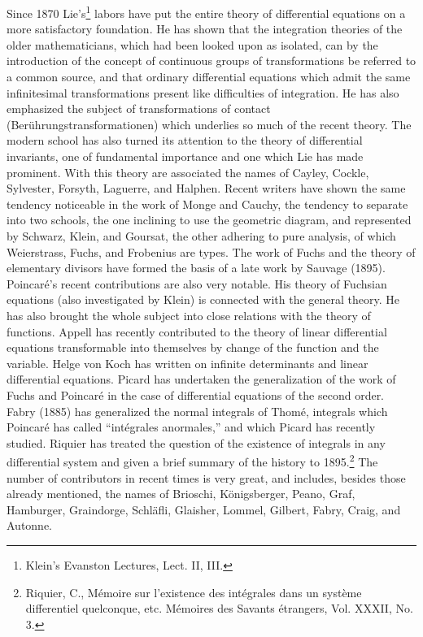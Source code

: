 \documentclass[oneside]{book}
\begin{document}
{Since 1870 Lie's\footnote{Klein's Evanston Lectures, Lect. II,
III.} labors have put the entire theory of differential equations
on a more satisfactory foundation. He has shown that the integration
theories of the older mathematicians, which had been looked upon as
isolated, can by the introduction of the concept of continuous
groups of transformations be referred to a common source, and that
ordinary differential equations which admit the same infinitesimal
transformations present like difficulties of integration. He has
also emphasized the subject of transformations of contact
(Ber\"uhrungstransformationen) which underlies so much of the recent
theory. The modern school has also turned its attention to the
theory of differential invariants, one of fundamental importance and
one which Lie has made prominent. With this theory are associated
the names of Cayley, Cockle, Sylvester, Forsyth, Laguerre, and
Halphen. Recent writers have shown the same tendency noticeable in
the work of Monge and Cauchy, the tendency to separate into two
schools, the one inclining to use the geometric diagram, and
represented by Schwarz, Klein, and Goursat, the other adhering to
pure analysis, of which Weierstrass, Fuchs, and Frobenius are
types. The work of Fuchs and the theory of elementary divisors have
formed the basis of a late work by Sauvage (1895). Poincar\'e's
recent contributions are also very notable. His theory of Fuchsian
equations (also investigated by Klein) is connected with the general
theory. He has also brought the whole subject into close relations
with the theory of functions. Appell has recently contributed to the
theory of linear differential equations transformable into
themselves by change of the function and the variable. Helge von
Koch has written on infinite determinants and linear differential
equations. Picard has undertaken the generalization of the work of
Fuchs and Poincar\'e in the case of differential equations of the
second order. Fabry (1885) has generalized the normal integrals of
Thom\'e, integrals which Poincar\'e has called ``int\'egrales
anormales,'' and which Picard has recently studied. Riquier has
treated the question of the existence of integrals in any
differential system and given a brief summary of the history to
1895.\footnote{Riquier, C., M\'emoire sur l'existence des
int\'egrales dans un syst\`eme differentiel quelconque,
etc. M\'emoires des Savants \'etrangers, Vol. XXXII, No. 3.} The
number of contributors in recent times is very great, and includes,
besides those already mentioned, the names of Brioschi,
K\"onigsberger, Peano, Graf, Hamburger, Graindorge, Schl\"afli,
Glaisher, Lommel, Gilbert, Fabry, Craig, and Autonne.

}
\end{document}
